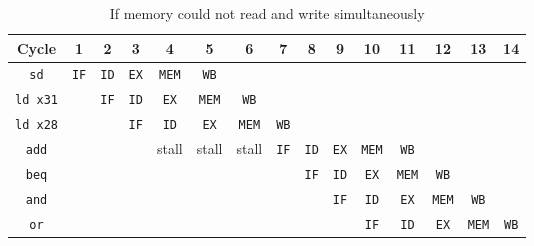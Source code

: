 \documentclass[12pt, a4paper]{article}
\begin{document}
\begin{table}[hbp]
\caption{If memory could not read and write simultaneously}
\label{tab:struct}
\centering
\begin{tabular}{ccccccccccccccc}
Cycle & 1 & 2 & 3 & 4 & 5 & 6 & 7 & 8 & 9 & 10 & 11 & 12 & 13 & 14 \\
\hline
\texttt{sd} & \texttt{IF} & \texttt{ID} & \texttt{EX} & \texttt{MEM} & \texttt{WB} \\
\texttt{ld x31} && \texttt{IF} & \texttt{ID} & \texttt{EX} & \texttt{MEM} & \texttt{WB}\\
\texttt{ld x28} &&& \texttt{IF} & \texttt{ID} & \texttt{EX} & \texttt{MEM} & \texttt{WB}\\
\texttt{add} &&&& stall & stall & stall & \texttt{IF} & \texttt{ID} & \texttt{EX} & \texttt{MEM} & \texttt{WB} \\
\texttt{beq} &&&&&&&& \texttt{IF}& \texttt{ID} & \texttt{EX} & \texttt{MEM} & \texttt{WB} \\
\texttt{and} &&&&&&&&& \texttt{IF} & \texttt{ID} & \texttt{EX} & \texttt{MEM} & \texttt{WB} \\
\texttt{or} &&&&&&&&&& \texttt{IF} & \texttt{ID} & \texttt{EX} & \texttt{MEM} & \texttt{WB}
\end{tabular}
\end{table}
\end{document}
